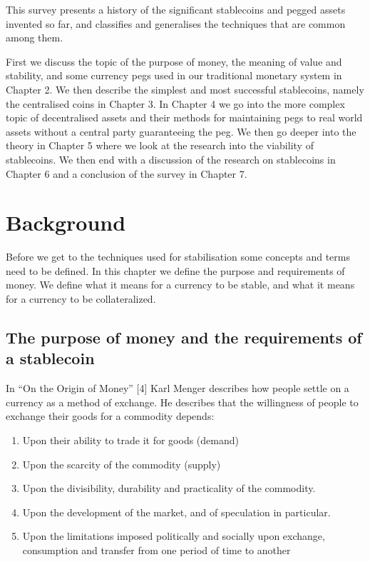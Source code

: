 \documentclass[english,]{IEEEtran}
\providecommand{\tightlist}{%
  \setlength{\itemsep}{0pt}\setlength{\parskip}{0pt}}
\begin{document}
This survey presents a history of the significant stablecoins and pegged
assets invented so far, and classifies and generalises the techniques
that are common among them.

First we discuss the topic of the purpose of money, the meaning of value
and stability, and some currency pegs used in our traditional monetary
system in Chapter 2. We then describe the simplest and most successful
stablecoins, namely the centralised coins in Chapter 3. In Chapter 4 we
go into the more complex topic of decentralised assets and their methods
for maintaining pegs to real world assets without a central party
guaranteeing the peg. We then go deeper into the theory in Chapter 5
where we look at the research into the viability of stablecoins. We then
end with a discussion of the research on stablecoins in Chapter 6 and a
conclusion of the survey in Chapter 7.

\section{Background}\label{background}

Before we get to the techniques used for stabilisation some concepts and
terms need to be defined. In this chapter we define the purpose and
requirements of money. We define what it means for a currency to be
stable, and what it means for a currency to be collateralized.

\subsection{The purpose of money and the requirements of a
stablecoin}\label{the-purpose-of-money-and-the-requirements-of-a-stablecoin}

In ``On the Origin of Money'' {[}4{]} Karl Menger describes how people
settle on a currency as a method of exchange. He describes that the
willingness of people to exchange their goods for a commodity depends:

\begin{enumerate}
\def\labelenumi{\arabic{enumi}.}
\tightlist
\item
  Upon their ability to trade it for goods (demand)
\item
  Upon the scarcity of the commodity (supply)
\item
  Upon the divisibility, durability and practicality of the commodity.
\item
  Upon the development of the market, and of speculation in particular.
\item
  Upon the limitations imposed politically and socially upon exchange,
  consumption and transfer from one period of time to another
\end{enumerate}
\end{document}
